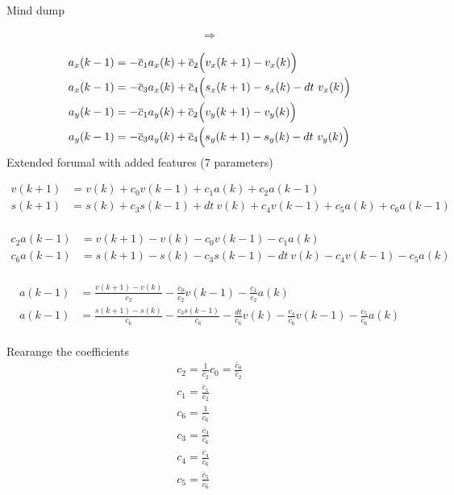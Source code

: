 \documentclass[10pt]{article}         %
\begin{document}
Mind dump


\begin{align}
\Rightarrow
\end{align}



\begin{align}
a_x(k-1) &= - \overline c_1 a_x(k)  + \overline c_2 \Bigl(v_x(k+1) - v_x(k)\Bigr)  \\
a_x(k-1) &= - \overline c_3 a_x(k)  + \overline c_4 \Bigl(s_x(k+1) - s_x(k) - dt \  v_x(k)\Bigr) \\
a_y(k-1) &= - \overline c_1 a_y(k)  + \overline c_2 \Bigl(v_y(k+1) - v_y(k)\Bigr)  \\
a_y(k-1) &= - \overline c_3 a_y(k)  + \overline c_4 \Bigl(s_y(k+1) - s_y(k) - dt \  v_y(k)\Bigr)
\end{align}
Extended forumal with added features (7 parameters)

\begin{align}
v(k+1) &= v(k) + c_0 v(k-1) + c_1 a(k) + c_2 a(k-1) \\
s(k+1) &= s(k) + c_3 s(k-1) + dt \  v(k) + c_4v(k-1) + c_5 a(k) + c_6 a(k-1) \\
\end{align}



\begin{align}
c_2 a(k-1) &= v(k+1) - v(k) - c_0 v(k-1) - c_1 a(k)                           \\
c_6 a(k-1) &= s(k+1) - s(k) - c_3 s(k-1) - dt \  v(k) - c_4v(k-1) - c_5 a(k)  \\
\end{align}

\begin{align}
a(k-1) &= \frac {v(k+1) - v(k)} {c_2} - \frac{c_0}{c_2} v(k-1) -\frac{c_1}{c_2} a(k)                           \\
a(k-1) &= \frac{ s(k+1) - s(k) }{c_6}  - \frac{ c_3 s(k-1) }{c_6}  - \frac{dt}{c_6} v(k) - \frac{c_4}{c_6}v(k-1) - \frac{c_5}{c_6} a(k)  \\
\end{align}

Rearange the coefficients
\begin{align}
    c_2 = \frac{1}{\overline c_2}
    c_0 = \frac{\overline c_0}{\overline c_2} \\
    c_1 = \frac{\overline c_1}{\overline c_2} \\
    c_6 = \frac{1}{\overline c_6} \\
    c_3 = \frac{\overline c_3}{\overline c_6} \\
    c_4 = \frac{\overline c_4}{\overline c_6} \\
    c_5 = \frac{\overline c_5}{\overline c_6} \\
\end{align}
\end{document}
